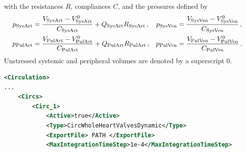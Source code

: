 with the resistances $R$, compliances $C$, and the pressures defined by
\begin{align}
    p_\text{SysArt} &= \frac{V_\mathrm{SysArt} - V_\mathrm{SysArt}^0}{C_\text{SysArt}} + Q_\mathrm{SysArt} R_\text{SysArt} \,,&
    p_\text{SysVen} &= \frac{V_\mathrm{SysVen} - V_\mathrm{SysVen}^0}{C_\text{SysVen}} \,,\\
    p_\text{PulArt} &= \frac{V_\mathrm{PulArt} - V_\mathrm{PulArt}^0}{C_\text{PulArt}} + Q_\mathrm{PulArt} R_\text{PulArt} \,,&
    p_\text{PulVen} &= \frac{V_\mathrm{PulVen} - V_\mathrm{PulVen}^0}{C_\text{PulVen}} \,. \label{eq:pressure}
\end{align}
Unstressed systemic and peripheral volumes are denoted by a superscript 0.
\begin{lstlisting}[language=XML,caption=.xml settings for the 4-chamber circulation model]
<Circulation>
...
    <Circs>
        <Circ_1>
            <Active>true</Active>
            <Type>CircWholeHeartValvesDynamic</Type>
            <ExportFile> PATH </ExportFile>
            <MaxIntegrationTimeStep>1e-4</MaxIntegrationTimeStep>
            

\end{lstlisting}
